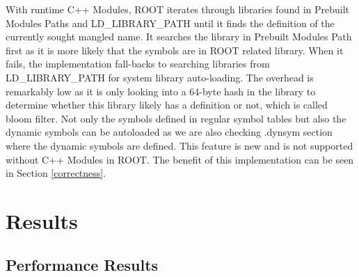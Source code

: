 \documentclass{webofc}
\begin{document}
With runtime C++ Modules, ROOT iterates through libraries found in Prebuilt Modules Paths and LD\_LIBRARY\_PATH until it finds the definition of the currently sought mangled name. It searches the library in Prebuilt Modules Path first as it is more likely that the symbols are in ROOT related library. When it fails, the implementation fall-backs to searching libraries from LD\_LIBRARY\_PATH for system library auto-loading. The overhead is remarkably low as it is only looking into a 64-byte hash in the library to determine whether this library likely has a definition or not, which is called bloom filter. Not only the symbols defined in regular symbol tables but also the dynamic symbols can be autoloaded as we are also checking .dynsym section where the dynamic symbols are defined. This feature is new and is not supported without C++ Modules in ROOT. The benefit of this implementation can be seen in Section \ref{correctness}.

\section{Results}
\label{results}

\subsection{Performance Results}
\label{performance}
\end{document}
